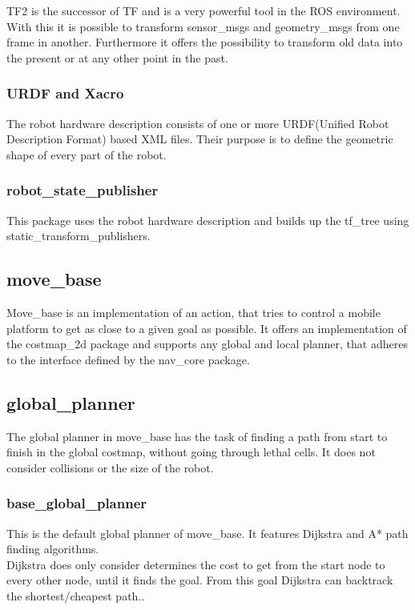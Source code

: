 TF2 is the successor of TF and is a very powerful tool in the ROS environment. With this it is possible to transform sensor\_msgs and geometry\_msgs from one frame in another. Furthermore it offers the possibility to transform old data into the present or at any other point in the past.

\subsubsection{URDF and Xacro}
The robot hardware description consists of one or more URDF(Unified Robot Description Format) based XML files. Their purpose is to define the geometric shape of every part of the robot. 

\subsubsection{robot\_state\_publisher}
	This package uses the robot hardware description and builds up the tf\_tree using static\_transform\_publishers.


\subsection{move\_base}
Move\_base is an implementation of an action, that tries to control a mobile platform to get as close to a given goal as possible. It offers an implementation of the costmap\_2d package and supports any global and local planner, that adheres to the interface defined by the nav\_core package\cite{movebase}.

\subsection{global\_planner}
The global planner in move\_base has the task of finding a path from start to finish in the global costmap, without going through lethal cells. It does not consider collisions or the size of the robot.

\subsubsection{base\_global\_planner}
This is the default global planner of move\_base. It features Dijkstra and A* path finding algorithms.\\

Dijkstra does only consider determines the cost to get from the start node to every other node, until it finds the goal. From this goal Dijkstra can backtrack the shortest/cheapest path.\cite{AlgorithmenundDatenstrukturen}.\\

